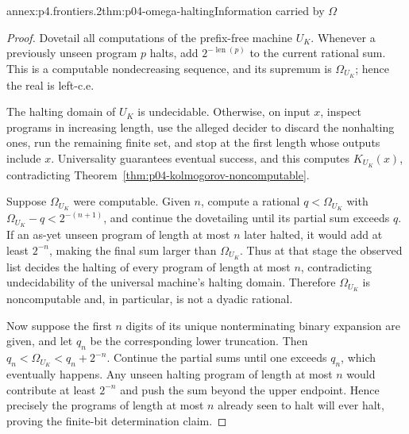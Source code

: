 \begin{annexitem}{annex:p4.frontiers.2}{thm:p04-omega-halting}{Information carried by \(\Omega\)}
\begin{proof}
Dovetail all computations of the prefix-free machine \(U_K\).  Whenever a
previously unseen program \(p\) halts, add \(2^{-\operatorname{len}(p)}\) to
the current rational sum.  This is a computable nondecreasing sequence, and
its supremum is \(\Omega_{U_K}\); hence the real is left-c.e.

The halting domain of \(U_K\) is undecidable.  Otherwise, on input \(x\),
inspect programs in increasing length, use the alleged decider to discard the
nonhalting ones, run the remaining finite set, and stop at the first length
whose outputs include \(x\).  Universality guarantees eventual success, and
this computes \(K_{U_K}(x)\), contradicting
Theorem~\ref{thm:p04-kolmogorov-noncomputable}.

Suppose \(\Omega_{U_K}\) were computable.  Given \(n\), compute a rational
\(q<\Omega_{U_K}\) with
\(\Omega_{U_K}-q<2^{-(n+1)}\), and continue the dovetailing until its partial
sum exceeds \(q\).  If an as-yet unseen program of length at most \(n\) later
halted, it would add at least \(2^{-n}\), making the final sum larger than
\(\Omega_{U_K}\).  Thus at that stage the observed list decides the halting
of every program of length at most \(n\), contradicting undecidability of the
universal machine's halting domain.  Therefore \(\Omega_{U_K}\) is
noncomputable and, in particular, is not a dyadic rational.

Now suppose the first \(n\) digits of its unique nonterminating binary
expansion are given, and let \(q_n\) be the corresponding lower truncation.
Then
\(q_n<\Omega_{U_K}<q_n+2^{-n}\).  Continue the partial sums until one exceeds
\(q_n\), which eventually happens.  Any unseen halting program of length at
most \(n\) would contribute at least \(2^{-n}\) and push the sum beyond the
upper endpoint.  Hence precisely the programs of length at most \(n\) already
seen to halt will ever halt, proving the finite-bit determination claim.
\end{proof}
\end{annexitem}
